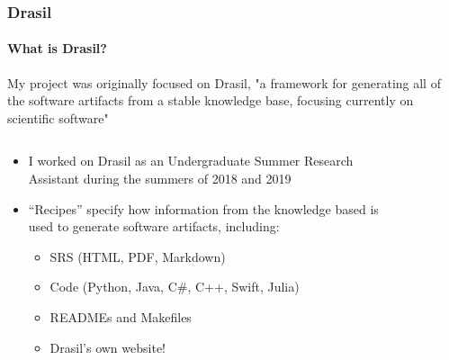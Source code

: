 \documentclass{beamer}
\begin{document}
\begin{frame}
    \frametitle{Drasil}
    \framesubtitle{What is Drasil?}
    My project was originally focused on Drasil, "a framework for generating
    all of the software artifacts from a stable knowledge base, focusing
    currently on scientific software" \cite{HuntEtAl2021}
    \vspace{-2mm}
    \begin{columns}[T,onlytextwidth]
        \begin{column}{.6\textwidth}
            \vspace{2mm}
            \begin{minipage}{\textwidth}
                \begin{itemize}
                    \item<2-> I worked on Drasil as an Undergraduate Summer
                          Research Assistant during the summers of 2018 and 2019
                    \item<3-> ``Recipes'' specify how information from the
                          knowledge based is used to generate
                          software artifacts, including:
                          \begin{itemize}
                              \item SRS (HTML, PDF, Markdown)
                              \item Code (Python, Java, C\#, C++, Swift, Julia)
                              \item READMEs and Makefiles
                              \item Drasil's own website\footnotemark[1]!
                          \end{itemize}
                \end{itemize}
            \end{minipage}
        \end{column}
        \begin{column}{.35\textwidth}
            \begin{figure}

\end{figure}
\end{column}
\end{columns}
\end{frame}
\end{document}
